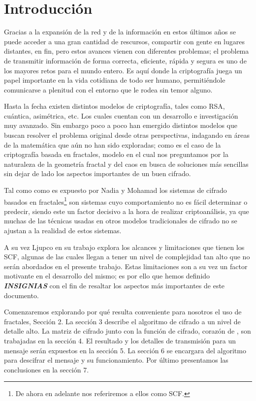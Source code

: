 \section{Introducci\'on}
Gracias a la expansi\'on de la red y de la informaci\'on en estos \'ultimos a\~nos se puede acceder a una gran cantidad de rescursos, compartir con gente en lugares distantes, en fin, pero estos avances vienen con diferentes problemas; el problema de transmitir informaci\'on de forma correcta, eficiente, r\'apida y segura es uno de los mayores retos para el mundo entero. Es aqu\'i donde la criptograf\'ia juega un papel importante en la vida cotidiana de todo ser humano, permiti\'endole comunicarse a plenitud con el entorno que le rodea sin temor alguno. 

Hasta la fecha existen distintos modelos de criptograf\'ia, tales como RSA, cu\'antica, asim\'etrica, etc. Los cuales cuentan con un desarrollo e investigaci\'on muy avanzado. Sin embargo poco a poco han emergido distintos modelos que buscan resolver el problema original desde otras perspectivas, indagando en \'areas de la matem\'atica que a\'un no han sido exploradas; como es el caso de la criptograf\'ia basada en fractales, modelo en el cual nos preguntamos por la naturaleza de la geometr\'ia fractal y del caos en busca de soluciones m\'as sencillas sin dejar de lado los aspectos importantes de un buen cifrado.

Tal como como es expuesto por Nadia y Mohamad \cite{Nadia} los sistemas de cifrado basados en fractales\footnote{De ahora en adelante nos referiremos a ellos como SCF.} son sistemas cuyo comportamiento no es f\'acil determinar o predecir, siendo este un factor decisivo a la hora de realizar criptoan\'alisis, ya que muchas de las t\'ecnicas usadas en otros modelos tradicionales de cifrado no se ajustan a la realidad de estos sistemas.

A su vez Ljupco \cite{Ljupco} en su trabajo explora los alcances y limitaciones que tienen los SCF, algunas de las cuales llegan a tener un nivel de complejidad tan alto que no ser\'an abordados en el presente trabajo. Estas limitaciones son a su vez un factor motivante en el desarrollo del mismo; es por ello que hemos definido \textbf{\emph{INSIGNIAS}} con el fin de resaltar los aspectos m\'as importantes de este documento.

Comenzaremos explorando por qu\'e resulta conveniente para nosotros el uso de fractales, Secci\'on 2. La secci\'on 3 describe el algoritmo de cifrado a un nivel de detalle alto. La matriz de cifrado junto con la funci\'on de cifrado, coraz\'on de  , son trabajadas en la secci\'on 4. El resultado y los detalles de transmisi\'on para un mensaje ser\'an expuestos en la secci\'on 5. La secci\'on 6 se encargara del algoritmo para descifrar el mensaje y su funcionamiento. Por \'ultimo presentamos las conclusiones en la secci\'on 7.

